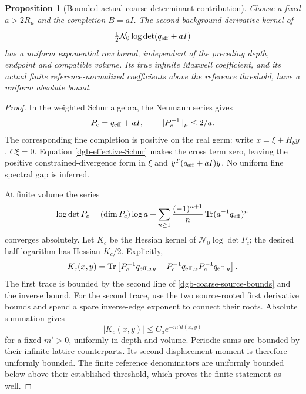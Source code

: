 \documentclass[11pt]{article}
\newtheorem{proposition}[theorem]{Proposition}
\theoremstyle{remark}
\begin{document}
\begin{proposition}[Bounded actual coarse determinant contribution]
\label{dgb-coarse-proposition}
Choose a fixed $a>2R_\mu$ and the completion $B=aI$.
The second-background-derivative kernel of
\[
                \tfrac12\mathcal N_0
                        \log\det(q_{\rm eff}+aI)
\]
has a uniform exponential row bound, independent of the
preceding depth, endpoint and compatible volume.
Its true infinite Maxwell coefficient, and its actual
finite reference-normalized coefficients above the
reference threshold, have a uniform absolute bound.
\end{proposition}

\begin{proof}
In the weighted Schur algebra, the Neumann series gives
\begin{equation}
 P_c=q_{\rm eff}+aI,\qquad
                         \|P_c^{-1}\|_\mu\leq 2/a.
 \label{dgb-coarse-inverse}
\end{equation}
The corresponding fine completion is positive on the
real germ: write $x=\xi+H_by$, $C\xi=0$.
Equation \eqref{dgb-effective-Schur} makes the cross term
zero, leaving the positive constrained-divergence form
in $\xi$ and $y^T(q_{\rm eff}+aI)y$.
No uniform fine spectral gap is inferred.

At finite volume the series
\begin{equation}
 \log\det P_c
   =(\dim P_c)\log a+
      \sum_{n\geq1}\frac{(-1)^{n+1}}n
                \operatorname{Tr}(a^{-1}q_{\rm eff})^n
 \label{dgb-coarse-log-series}
\end{equation}
converges absolutely. Let $K_c$ be the Hessian kernel of
$\mathcal N_0\log\det P_c$; the desired half-logarithm
has Hessian $K_c/2$. Explicitly,
\begin{equation}
 K_c(x,y)=\operatorname{Tr}\left[
       P_c^{-1}q_{{\rm eff},xy}
       -P_c^{-1}q_{{\rm eff},x}
                   P_c^{-1}q_{{\rm eff},y}\right].
 \label{dgb-coarse-trace}
\end{equation}
The first trace is bounded by the second line of
\eqref{dgb-coarse-source-bounds} and the inverse bound.
For the second trace, use the two source-rooted first
derivative bounds and spend a spare inverse-edge
exponent to connect their roots. Absolute summation gives
\begin{equation}
                            |K_c(x,y)|
                                \leq C_a e^{-m'd(x,y)}
 \label{dgb-coarse-Hessian-decay}
\end{equation}
for a fixed $m'>0$, uniformly in depth and volume.
Periodic sums are bounded by their infinite-lattice
counterparts. Its second displacement moment is therefore
uniformly bounded. The finite reference denominators
are uniformly bounded below above their established
threshold, which proves the finite statement as well.
\end{proof}
\end{document}
